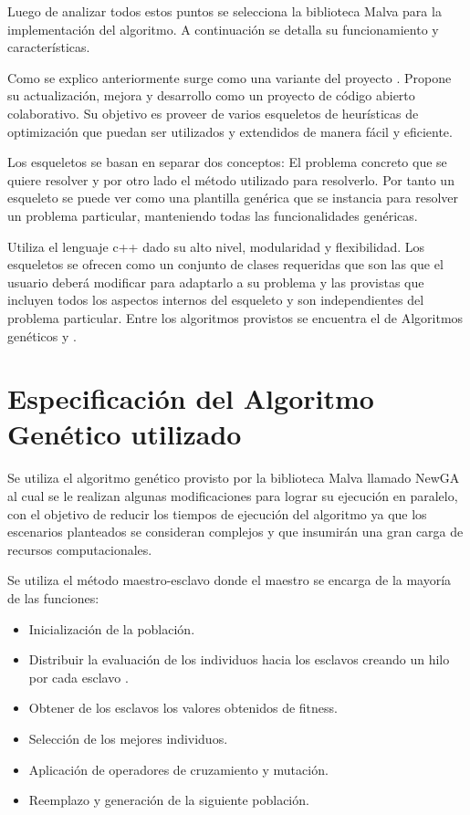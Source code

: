Luego de analizar todos estos puntos se selecciona la biblioteca Malva para la implementación del algoritmo. A continuación se detalla su funcionamiento y características.


Como se explico anteriormente \citet{Malva} surge como una variante del proyecto \citet{Mallba}. Propone su actualización, mejora y desarrollo como un proyecto de código abierto colaborativo.  Su objetivo es proveer de varios esqueletos de  heurísticas de optimización que puedan ser utilizados y extendidos de manera fácil y eficiente.

Los esqueletos se basan en separar dos conceptos: El problema concreto que se quiere resolver y por otro lado el método utilizado para resolverlo. Por tanto un esqueleto se puede ver como una plantilla genérica que se instancia para resolver un problema particular, manteniendo todas las funcionalidades genéricas.

Utiliza el lenguaje c++ dado su alto nivel, modularidad y flexibilidad. Los esqueletos se ofrecen como un conjunto de clases requeridas que son las que el usuario deberá modificar para adaptarlo a su problema y las provistas que incluyen todos los aspectos internos del esqueleto y son independientes del problema particular. Entre los algoritmos provistos se encuentra el de Algoritmos genéticos y \citet{CHC}.





\section{Especificación del Algoritmo Genético utilizado}
Se utiliza el algoritmo genético provisto por la biblioteca  Malva  llamado NewGA al cual se le realizan algunas modificaciones para lograr su ejecución en paralelo, con el objetivo de reducir los tiempos de ejecución del algoritmo ya que los escenarios planteados se consideran complejos y que insumirán una gran carga de recursos computacionales.

Se utiliza el método maestro-esclavo donde el maestro se encarga de la mayoría de las funciones:

\begin{itemize}
\item Inicialización de la población.
\item Distribuir la evaluación de los individuos hacia los esclavos creando un hilo por cada esclavo	.
\item Obtener de los esclavos los valores obtenidos de fitness.
\item Selección de los mejores individuos.
\item Aplicación de operadores de cruzamiento y mutación.
\item Reemplazo y generación de la siguiente población.
\end{itemize}

